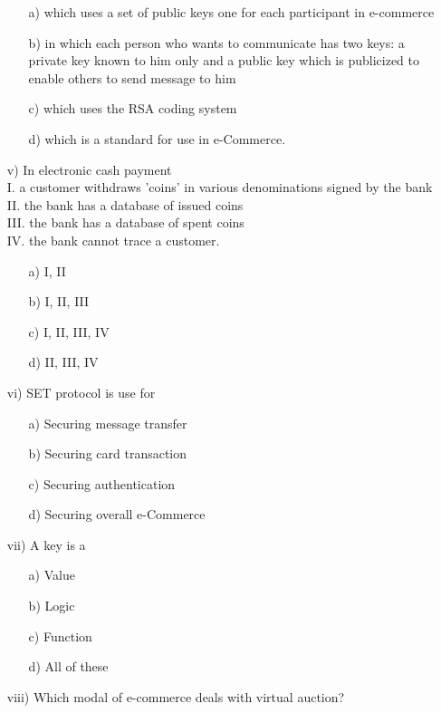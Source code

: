 \documentclass{article}
\begin{document}
\begin{enumerate}
\begin{enumerate}
        \item[a)] which uses a set of public keys one for each participant in e-commerce
        \item[b)] in which each person who wants to communicate has two keys: a private key known to him only and a public key which is publicized to enable others to send message to him
        \item[c)] which uses the RSA coding system
        \item[d)] which is a standard for use in e-Commerce.
    \end{enumerate}
    \item[v)] In electronic cash payment \\
    I. a customer withdraws 'coins' in various denominations signed by the bank \\
    II. the bank has a database of issued coins \\
    III. the bank has a database of spent coins \\
    IV. the bank cannot trace a customer.
    \begin{enumerate}
        \item[a)] I, II
        \item[b)] I, II, III
        \item[c)] I, II, III, IV
        \item[d)] II, III, IV
    \end{enumerate}
    \item[vi)] SET protocol is use for
    \begin{enumerate}
        \item[a)] Securing message transfer
        \item[b)] Securing card transaction
        \item[c)] Securing authentication
        \item[d)] Securing overall e-Commerce
    \end{enumerate}
    \item[vii)] A key is a
    \begin{enumerate}
        \item[a)] Value
        \item[b)] Logic
        \item[c)] Function
        \item[d)] All of these
    \end{enumerate}
    \item[viii)] Which modal of e-commerce deals with virtual auction?
    \begin{enumerate}

\end{enumerate}
\end{enumerate}
\end{document}
